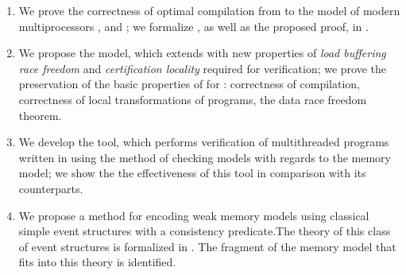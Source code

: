 {}
\begin{enumerate}[beginpenalty=10000] %

\item 
We prove the correctness of optimal compilation from \Wkm 
to the model of modern multiprocessors \TSO, \ARM and \POWER;
we formalize \Wkm, as well as the proposed proof, in \coq.
\item We propose the \WkmS model, which extends \Wkm with
new properties of \emph{load buffering race freedom} 
and \emph{certification locality} required for verification; we prove the preservation of the basic properties of \Wkm for \WkmS: correctness of compilation, correctness of local transformations of programs, the data race freedom theorem.
\item We develop the \wmc tool, which performs verification of multithreaded programs
written in \CLANG using the method of checking models with regards to the \WkmS memory model; we show the
the effectiveness of this tool in comparison with its counterparts.

\item We propose a method for encoding weak memory models using classical simple event structures with a consistency predicate.The theory of this class of event structures is formalized in \coq. The fragment of the \Wkm memory model that fits into this theory is identified.
\end{enumerate}

